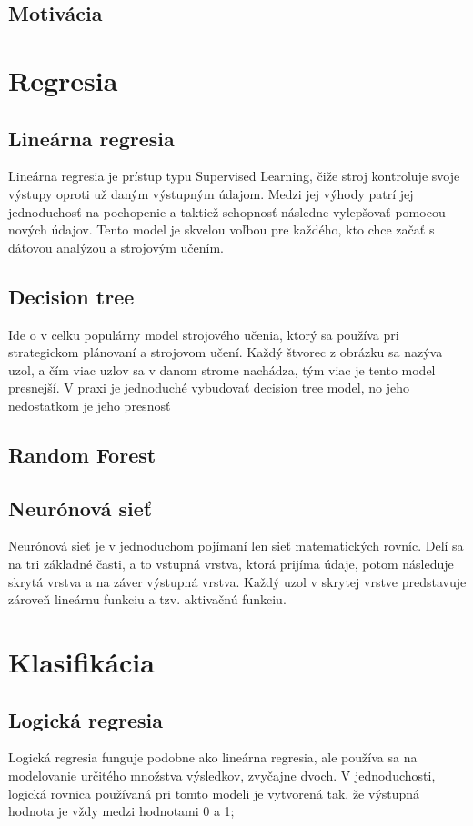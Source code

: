 \documentclass[8pt,twoside,slovak,a4paper]{article}
\begin{document}
\subsection{Motivácia} \label{motivacia}
\newpage
\section{Regresia} 
\subsection{Lineárna regresia}
Lineárna regresia je prístup typu Supervised Learning, čiže stroj kontroluje svoje výstupy oproti už daným výstupným údajom. Medzi jej výhody patrí jej jednoduchosť na pochopenie a taktiež schopnosť následne vylepšovať pomocou nových údajov. Tento model je skvelou voľbou pre každého, kto chce začať s dátovou analýzou a strojovým učením. \cite{8862451}

\subsection{Decision tree}
Ide o v celku populárny model strojového učenia, ktorý sa používa pri strategickom plánovaní a strojovom učení. Každý štvorec z obrázku sa nazýva uzol, a čím viac uzlov sa v danom strome nachádza, tým viac je tento model presnejší. V praxi je jednoduché vybudovať decision tree model, no jeho nedostatkom je jeho presnosť
\subsection{Random Forest}
\subsection{Neurónová sieť} 
Neurónová sieť je v jednoduchom pojímaní len sieť matematických rovníc. Delí sa na tri základné časti, a to vstupná vrstva, ktorá prijíma údaje, potom následuje skrytá vrstva a na záver výstupná vrstva. Každý uzol v skrytej vrstve predstavuje zároveň lineárnu funkciu a tzv. aktivačnú funkciu.

\newpage
\section{Klasifikácia}
\subsection{Logická regresia}
Logická regresia funguje podobne ako lineárna regresia, ale používa sa na modelovanie určitého množstva výsledkov, zvyčajne dvoch. V jednoduchosti, logická rovnica používaná pri tomto modeli je vytvorená tak, že výstupná hodnota je vždy medzi hodnotami 0 a 1;
\end{document}
